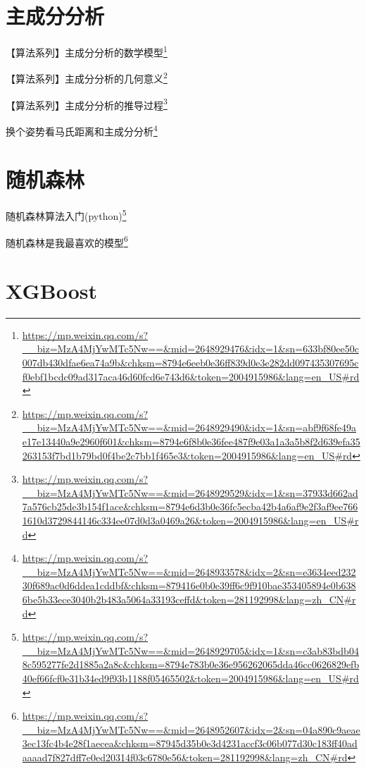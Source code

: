 \documentclass[]{ctexbook}
\renewcommand{\href}[2]{#2\footnote{\url{#1}}}
\begin{document}
\hypertarget{ux4e3bux6210ux5206ux5206ux6790}{%
\section{主成分分析}\label{ux4e3bux6210ux5206ux5206ux6790}}

\href{https://mp.weixin.qq.com/s?__biz=MzA4MjYwMTc5Nw==\&mid=2648929476\&idx=1\&sn=633bf80ee50c007db430dfae6ea74a9b\&chksm=8794e6eeb0e36ff839d0e3e282dd097435307695cf0ebf1bcdc09ad317aca46d60fcd6e743d6\&token=2004915986\&lang=en_US\#rd}{【算法系列】主成分分析的数学模型}

\href{https://mp.weixin.qq.com/s?__biz=MzA4MjYwMTc5Nw==\&mid=2648929490\&idx=1\&sn=abf9f68fe49ae17e13440a9e2960f601\&chksm=8794e6f8b0e36fee487f9e03a1a3a5b8f2d639efa35263153f7bd1b79bd0f4be2c7bb1f465e3\&token=2004915986\&lang=en_US\#rd}{【算法系列】主成分分析的几何意义}

\href{https://mp.weixin.qq.com/s?__biz=MzA4MjYwMTc5Nw==\&mid=2648929529\&idx=1\&sn=37933d662ad7a576cb25de3b154f1ace\&chksm=8794e6d3b0e36fc5ecba42b4a6af9e2f3af9ee7661610d3729844146c334ee07d0d3a0469a26\&token=2004915986\&lang=en_US\#rd}{【算法系列】主成分分析的推导过程}

\href{https://mp.weixin.qq.com/s?__biz=MzA4MjYwMTc5Nw==\&mid=2648933578\&idx=2\&sn=e3634eed23230f689ac0d6ddea1cddbf\&chksm=879416e0b0e39ff6c9f910bae353405894e0b6386be5b33ece3040b2b483a5064a33193ceffd\&token=281192998\&lang=zh_CN\#rd}{换个姿势看马氏距离和主成分分析}

\hypertarget{ux968fux673aux68eeux6797}{%
\section{随机森林}\label{ux968fux673aux68eeux6797}}

\href{https://mp.weixin.qq.com/s?__biz=MzA4MjYwMTc5Nw==\&mid=2648929705\&idx=1\&sn=c3ab83bdb048c595277fe2d1885a2a8c\&chksm=8794e783b0e36e956262065dda46cc0626829efb40ef66fcf0e31b34ed9f93b1188f05465502\&token=2004915986\&lang=en_US\#rd}{随机森林算法入门(python)}

\href{https://mp.weixin.qq.com/s?__biz=MzA4MjYwMTc5Nw==\&mid=2648952607\&idx=2\&sn=04a890c9aeae3ec13fc4b4e28f1aecea\&chksm=87945d35b0e3d4231accf3c06b077d30c183ff40adaaaad7f827dff7e0ed20314f03c6780e56\&token=281192998\&lang=zh_CN\#rd}{随机森林是我最喜欢的模型}

\hypertarget{xgboost}{%
\section{XGBoost}\label{xgboost}}
\end{document}
